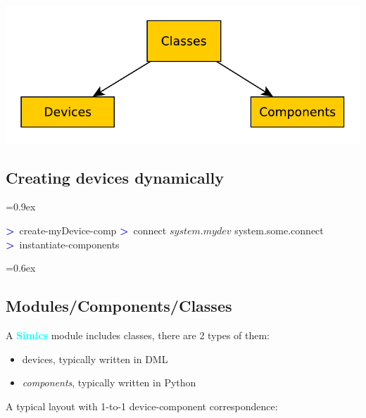 \documentclass[8pt]{extarticle}
\newenvironment{code}[1][]{%
\begin{prebox}[#1]\obeylines%
\fontdimen2\font=0.9ex%
}{%
\end{prebox}%
\fontdimen2\font=0.6ex%
}
\newcommand{\sprompt}{\textcolor{blue}{\textbf{>}\ }}
\newcommand{\p}[1]{\textit{\large#1}}
\newcommand{\Simics}{\textcolor{cyan}{\textbf{Simics}}}
\newlength{\MyLen}
\begin{document}
\begin{multicols*}{3}
\begin{tabular}{p{\the\MyLen}p{\linewidth-\the\MyLen-0.8cm}}
    \end{tabular}

\includegraphics[width=\linewidth]{diagrams/classes_devices_components.pdf}
\subsection{Creating devices dynamically}
\begin{code}
\sprompt create-myDevice-comp
\sprompt connect $system.mydev$ system.some.connect
\sprompt instantiate-components
\end{code}

\subsection{Modules/Components/Classes}
A \Simics{} module includes classes, there are 2 types of them:
        \begin{itemize}
            \item devices, typically written in DML
            \item \textit{components}, typically written in Python
        \end{itemize}
%
%
%


A typical layout with 1-to-1 device-component correspondence:

\end{multicols*}
\end{document}
